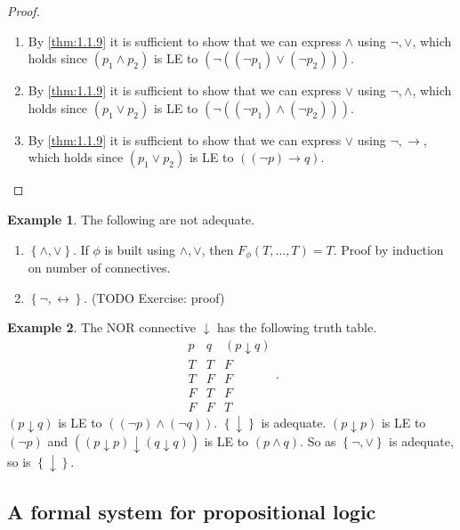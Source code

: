 \documentclass{article}
\newcommand{\rb}[1]{\left( #1 \right)}
\newcommand{\cb}[1]{\left\{ #1 \right\}}
\newcommand{\notb}[1]{\rb{\neg #1}}
\newcommand{\orb}[2]{\rb{#1 \lor #2}}
\newcommand{\andb}[2]{\rb{#1 \land #2}}
\newcommand{\impb}[2]{\rb{#1 \rightarrow #2}}
\theoremstyle{definition}\newtheorem{definition}{Definition}[subsection]
\theoremstyle{definition}\newtheorem{remark}[definition]{Remark}
\theoremstyle{definition}\newtheorem*{example}{Example}
\theoremstyle{definition}\newtheorem*{note}{Note}
\begin{document}
\begin{proof}
\hfill
\begin{enumerate}
\item By \ref{thm:1.1.9} it is sufficient to show that we can express $ \land $ using $ \neg, \lor $, which holds since $ \andb{p_1}{p_2} $ is LE to $ \notb{\orb{\notb{p_1}}{\notb{p_2}}} $.
\item By \ref{thm:1.1.9} it is sufficient to show that we can express $ \lor $ using $ \neg, \land $, which holds since $ \orb{p_1}{p_2} $ is LE to $ \notb{\andb{\notb{p_1}}{\notb{p_2}}} $.
\item By \ref{thm:1.1.9} it is sufficient to show that we can express $ \lor $ using $ \neg, \rightarrow $, which holds since $ \orb{p_1}{p_2} $ is LE to $ \impb{\notb{p}}{q} $.
\end{enumerate}
\end{proof}


\begin{example}
The following are not adequate.
\begin{enumerate}
\item $ \cb{\land, \lor} $. If $ \phi $ is built using $ \land, \lor $, then $ F_\phi\rb{T, \dots, T} = T $. Proof by induction on number of connectives.
\item $ \cb{\neg, \leftrightarrow} $. (TODO Exercise: proof)
\end{enumerate}
\end{example}

\begin{example}
The NOR connective $ \downarrow $ has the following truth table.
$$
\begin{array}{cc|c}
p & q & \rb{p \downarrow q} \\
\hline
T & T & F \\
T & F & F \\
F & T & F \\
F & F & T
\end{array}.
$$
$ \rb{p \downarrow q} $ is LE to $ \andb{\notb{p}}{\notb{q}} $. $ \cb{\downarrow} $ is adequate. $ \rb{p \downarrow p} $ is LE to $ \notb{p} $ and $ \rb{\rb{p \downarrow p} \downarrow \rb{q \downarrow q}} $ is LE to $ \andb{p}{q} $. So as $ \cb{\neg, \lor} $ is adequate, so is $ \cb{\downarrow} $.
\end{example}

\subsection{A formal system for propositional logic}
\end{document}
